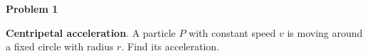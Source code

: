 \documentclass{article}
\begin{document}
{\bf Problem 1}

{\bf Centripetal acceleration}. A particle ${P}$ with constant speed $v$ is moving around a fixed circle with radius $r$. Find its acceleration.
\end{document}
